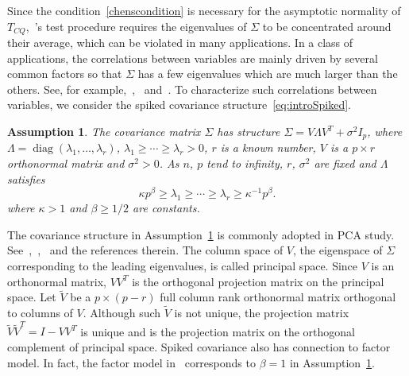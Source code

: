 \documentclass[review]{elsarticle}
\DeclareMathOperator{\mydiag}{diag}
\theoremstyle{plain}
\newtheorem{assumption}{\quad\quad Assumption}
\theoremstyle{definition}
\theoremstyle{remark}
\begin{document}
    Since the condition~\eqref{chenscondition} is necessary for the asymptotic normality of $T_{CQ}$,~\cite{Chen2010A}'s test procedure requires the eigenvalues of $\Sigma$ to be concentrated around their average, which can be violated in many applications.
   In a class of applications, the correlations between variables are mainly driven by several common factors so that $\Sigma$ has a few eigenvalues which are much larger than the others.
    See, for example,~\cite{Jung2009PCA},~\cite{Cai2012Sparse} and~\cite{Fan2015Asymptotics}.
To characterize such correlations between variables, we consider the  spiked covariance structure~\eqref{eq:introSpiked}.
\begin{assumption}\label{theModel}
    The covariance matrix $\Sigma$ has structure $ 
\Sigma=V\Lambda V^T+\sigma^2 I_p
$, where $\Lambda=\mydiag(\lambda_{1},\ldots,\lambda_{r})$, 
 $\lambda_{1}\geq \cdots \geq \lambda_{r}>0$, $r$ is a known number,
$V$ is  a $p\times r$ orthonormal matrix and $\sigma^2>0$.
As $n$, $p$ tend to infinity, 
$r$, $\sigma^2$ are fixed and $\Lambda$ satisfies     
    \begin{equation*}
        \kappa p^{\beta}\geq \lambda_{1}\geq \cdots \geq\lambda_{r}\geq \kappa^{-1}p^{\beta}.
\end{equation*}
where $\kappa>1$ and $\beta\geq {1}/{2}$ are constants.
\end{assumption}

The covariance structure in Assumption~\ref{theModel} is commonly adopted in PCA study.
See~\cite{Cai2012Sparse},~\cite{Birnbaum2013},~\cite{Passemier2015} and the references therein.
The column space of $V$,  the eigenspace of $\Sigma$ corresponding to the leading eigenvalues, is called principal space. Since $V$ is an orthonormal matrix, $V V^T$ is the orthogonal projection matrix on the principal space.
Let $\tilde{V}$ be a $p\times (p-r)$ full column rank orthonormal matrix orthogonal to columns of  $V$.
 Although such $\tilde{V}$ is not unique, the projection matrix  $\tilde{V}\tilde{V}^T=I-V V^T$ is unique and is the projection matrix on the orthogonal complement of principal space.
Spiked covariance also has connection to factor model.
In fact, the factor model in~\cite{Ma2015A} corresponds to $\beta=1$ in Assumption~\ref{theModel}.
\end{document}
